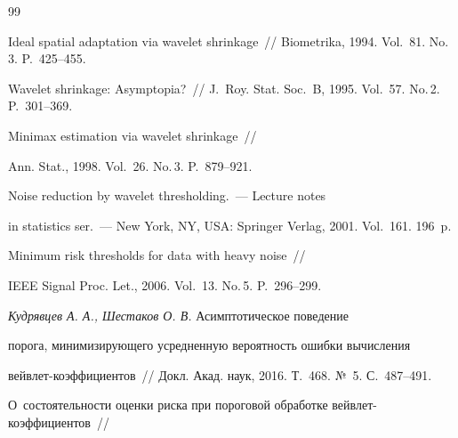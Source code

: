 {\small\frenchspacing

{%


\begin{thebibliography}{99}





Ideal spatial adaptation via wavelet shrinkage~/\!\!/ Biometrika, 1994. Vol.~81. No.\,3. P.~425--455.





Wavelet shrinkage: Asymptopia?~/\!\!/ J.~Roy. Stat. Soc.~B, 1995. Vol.~57. No.\,2. P.~301--369.




 Minimax estimation via wavelet shrinkage~/\!\!/ 

Ann. Stat., 1998. Vol.~26. No.\,3. P.~879--921.




 Noise reduction by wavelet thresholding.~--- Lecture notes 

in statistics ser.~--- New York, NY, USA: Springer Verlag, 2001. Vol.~161. 196~p.




 Minimum risk thresholds for data with heavy noise~/\!\!/ 

IEEE Signal Proc. Let., 2006. Vol.~13. No.\,5. P.~296--299.




{\it Кудрявцев А. А., Шестаков О. В.} Асимптотическое поведение 

порога, минимизирующего усредненную вероятность ошибки вычисления 

вейвлет-ко\-эф\-фи\-ци\-ен\-тов~/\!\!/ Докл. Акад. наук, 2016. Т.~468. №~5. С.~487--491.





О~состоятельности оценки риска при пороговой обработке вейв\-лет-ко\-эф\-фи\-ци\-ен\-тов~/\!\!/ 


\end{thebibliography}}}
